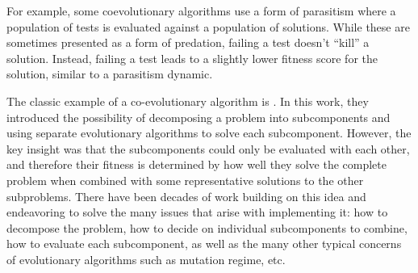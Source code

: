 For example, some coevolutionary algorithms use a form of parasitism where a population of tests is evaluated against a population of solutions. %
While these are sometimes presented as a form of predation, failing a test doesn't ``kill'' a solution.
Instead, failing a test leads to a slightly lower fitness score for the solution, similar to a parasitism dynamic.

The classic example of a co-evolutionary algorithm is \citet{potter2000cooperative}.
In this work, they introduced the possibility of decomposing a problem into subcomponents and using separate evolutionary algorithms to solve each subcomponent.
However, the key insight was that the subcomponents could only be evaluated with each other, and therefore their fitness is determined by how well they solve the complete problem when combined with some representative solutions to the other subproblems.
There have been decades of work \citep{ma2018survey, pan2022effective, gong2015distributed, goh2009competitivecooperative, antonio2017coevolutionary,hancer2025survey, wiegand2004analysis, garciapedrajas2005cooperative, wiegand2001empirical, byrski2015evolutionary} building on this idea and endeavoring to solve the many issues that arise with implementing it: how to decompose the problem, how to decide on individual subcomponents to combine, how to evaluate each subcomponent, as well as the many other typical concerns of evolutionary algorithms such as mutation regime, etc.

